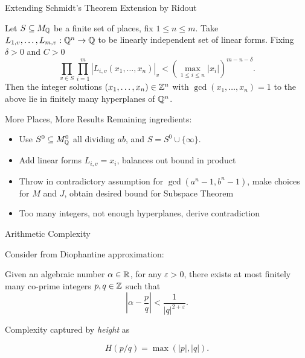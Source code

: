 \documentclass{beamer}
\begin{document}
\begin{frame}{Extending Schmidt's Theorem}
    Extension by Ridout

    \begin{theorem}
        Let $S \subseteq M_{\mathbb{Q}}$ be a finite set of places, fix $1 \leq n \leq m$.
        Take $L_{1,v}, \ldots, L_{m, v} : \mathbb{Q}^n \to \mathbb{Q}$ to be linearly independent set of linear forms.
        Fixing $\delta > 0$ and $C > 0$
        \[
            \prod_{v \in S}\prod_{i = 1}^m |L_{i,v}(x_1, \ldots, x_n)|_v < (\max_{1 \leq i \leq n} |x_i|)^{m - n - \delta}.
        \]
        Then the integer solutions $(x_1, \ldots, x_n) \in \mathbb{Z}^n$ with $\gcd(x_1, \ldots, x_n) = 1$ to the above lie in finitely many hyperplanes of $\mathbb{Q}^n$.
    \end{theorem}

\end{frame}

\begin{frame}{More Places, More Results}
    Remaining ingredients: 
    \begin{itemize}
        \item Use $S^0 \subseteq M_{\mathbb{Q}}^0$ all dividing $ab$, and $S = S^0 \cup \{ \infty \}$. 
        \item Add linear forms $L_{i, v} = x_i$, balances out bound in product
        \item Throw in contradictory assumption for $\gcd(a^n - 1, b^n - 1)$,
            make choices for $M$ and $J$,
            obtain desired bound for Subspace Theorem
        \item Too many integers, not enough hyperplanes, derive contradiction
    \end{itemize}
\end{frame}

\begin{frame}{Arithmetic Complexity}
    
    Consider from Diophantine approximation:

    \begin{theorem}
        Given an algebraic number $\alpha \in \mathbb{R}$, for any $\varepsilon > 0$,
        there exists at most finitely many co-prime integers $p, q \in \mathbb{Z}$ such that
        \[
            \left|\alpha - \frac{p}{q}\right| < \frac{1}{|q|^{2 + \varepsilon}}.
        \]
    \end{theorem}


    Complexity captured by \textit{height} as

    \[
        H(p/q) = \max(|p|, |q|).
    \]
\end{frame}
\end{document}

